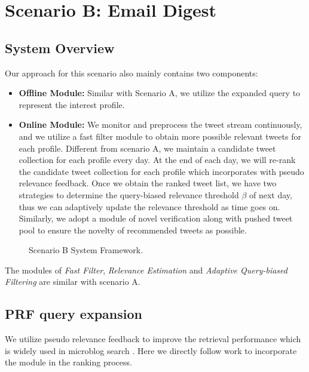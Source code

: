 \section{Scenario B: Email Digest}
\subsection{System Overview}
Our approach for this scenario also mainly contains two components:
\begin{itemize}
\item \textbf{Offline Module:} Similar with Scenario A, we utilize the expanded query to represent the interest profile.
\item \textbf{Online Module:} We monitor and preprocess the tweet stream continuously, and we utilize a fast filter module to obtain more possible relevant tweets for each profile. Different from scenario A, we maintain a candidate tweet collection for each profile every day. At the end of each day, we will re-rank the candidate tweet collection for each profile which incorporates with pseudo relevance feedback. Once we obtain the ranked tweet list, we have two strategies to determine the query-biased relevance threshold $\beta$ of next day, thus we can adaptively update the relevance threshold as time goes on. Similarly, we adopt a module of novel verification along with pushed tweet pool to ensure the novelty of recommended tweets as possible.
\end{itemize}

\begin{figure}[htbp]
\centering
{
}
\caption{Scenario B System Framework.}
\label{fig:Bsys}
\end{figure}

The modules of \textit{Fast Filter}, \textit{Relevance Estimation} and \textit{Adaptive Query-biased Filtering} are similar with scenario A.
\subsection{PRF query expansion}
We utilize pseudo relevance feedback to improve the retrieval performance which is widely used in microblog search \cite{lv2009comparative}.
Here we directly follow \cite{liang2012exploiting} work to incorporate the module in the ranking process.


